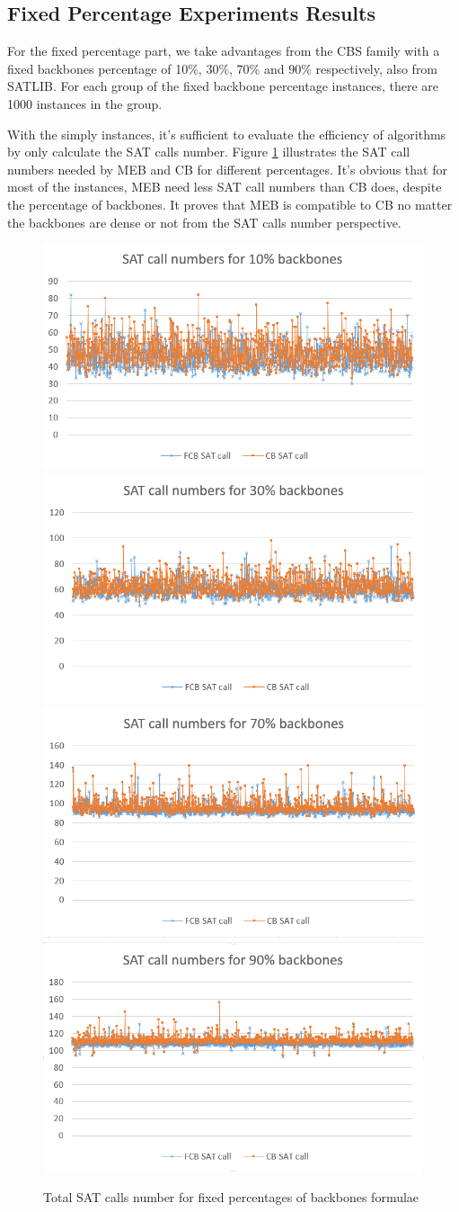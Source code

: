 \subsection{Fixed Percentage Experiments Results}

For the fixed percentage part, we take advantages from the CBS family with a fixed backbones percentage of 10\%, 30\%, 70\% and 90\% respectively, also from SATLIB.
For each group of the fixed backbone percentage instances, there are 1000 instances in the group.

With the simply instances, it's sufficient to evaluate the efficiency of algorithms by only calculate the SAT calls number.
Figure \ref{fig:fix} illustrates the SAT call numbers needed by MEB and CB for different percentages. It's obvious that for most of the instances, MEB need less SAT call numbers than CB does, despite the percentage of backbones. It proves that MEB is compatible to CB no matter the backbones are dense or not from the SAT calls number perspective.
\begin{figure} \centering
  \includegraphics[width=.5\linewidth-0.45mm]{bb-10.png}\hfill
  \includegraphics[width=.5\linewidth-0.45mm]{bb-30.png}\\[0.5mm]
  \includegraphics[width=.5\linewidth-0.25mm]{bb-70.png}\hfill
  \includegraphics[width=.5\linewidth-0.25mm]{bb-90.png}

    \caption{Total SAT calls number for fixed percentages of backbones formulae}
   \label{fig:fix}
\end{figure}

